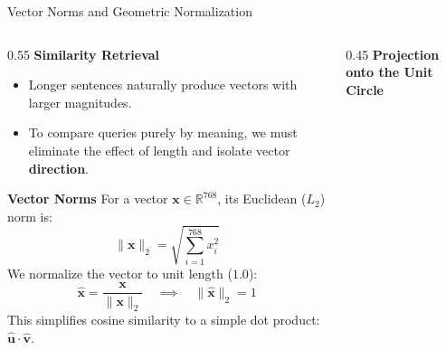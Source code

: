 \documentclass[9pt]{beamer}
\begin{document}
\begin{frame}{Vector Norms and Geometric Normalization}
    \begin{columns}
        \begin{column}{0.55\textwidth}
            \textbf{Similarity Retrieval}
            \begin{itemize}
                \item Longer sentences naturally produce vectors with larger magnitudes.
                \item To compare queries purely by meaning, we must eliminate the effect of length and isolate vector \textbf{direction}.
            \end{itemize}
            \vspace{0.15cm}
            \textbf{Vector Norms}
            For a vector $\mathbf{x} \in \mathbb{R}^{768}$, its Euclidean ($L_2$) norm is:
            \[
            \|\mathbf{x}\|_2 = \sqrt{\sum_{i=1}^{768} x_i^2}
            \]
            We normalize the vector to unit length ($1.0$):
            \[
            \hat{\mathbf{x}} = \frac{\mathbf{x}}{\|\mathbf{x}\|_2} \quad \implies \quad \|\hat{\mathbf{x}}\|_2 = 1
            \]
            This simplifies cosine similarity to a simple dot product: $\hat{\mathbf{u}} \cdot \hat{\mathbf{v}}$.
        \end{column}
        
        \begin{column}{0.45\textwidth}
            \centering
            \textbf{\small Projection onto the Unit Circle}
            \vspace{0.2cm}
            
        \end{column}
    \end{columns}
\end{frame}
\end{document}
